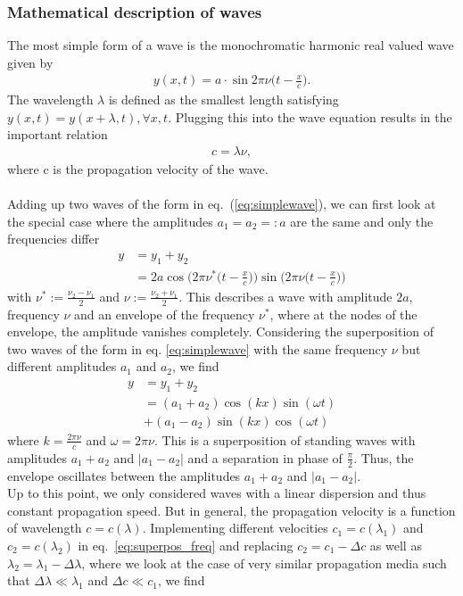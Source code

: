 \documentclass[a4paper,10pt,twocolumn]{article}
\begin{document}
    \subsubsection{Mathematical description of waves}
    The most simple form of a wave is the monochromatic harmonic real valued wave given by
    \begin{align}\label{eq:simplewave}
    y(x,t)=a\cdot\sin{2\pi\nu\Big(t-\frac{x}{c}\Big)}.
    \end{align}
    The wavelength $\lambda$ is defined as the smallest length satisfying $y(x,t)={y(x+\lambda,t), \forall x,t}$. Plugging this into the wave equation results in the important relation
    \begin{align*}
        c=\lambda\nu,
    \end{align*}
    where c is the propagation velocity of the wave.
    \\\\Adding up two waves of the form in eq.~(\ref{eq:simplewave}), we can first look at the special case where the amplitudes $a_1=a_2=:a$ are the same and only the frequencies differ
    \begin{align}
        y&=y_1+y_2 \nonumber\\&=2a\cos{\Big(2\pi\nu^*\big(t-\frac{x}{c}\big)\Big)}\sin{\Big(2\pi\nu\big(t-\frac{x}{c}\big)\Big)}
        \label{eq:superpos_freq}
    \end{align}
    with $\nu^*:=\frac{\nu_2-\nu_1}{2}$ and $\nu:=\frac{\nu_2+\nu_1}{2}$. This describes a wave with amplitude $2a$, frequency $\nu$ and an envelope of the frequency $\nu^*$, where at the nodes of the envelope, the amplitude vanishes completely.
    Considering the superposition of two waves of the form in eq. \ref{eq:simplewave} with the same frequency $\nu$ but different amplitudes $a_1$ and $a_2$, we find
    \begin{align}
        y&=y_1+y_2\nonumber\\&=(a_1+a_2)\cos{(kx)}\sin{(\omega t)}\nonumber\\&+ (a_1-a_2)\sin{(kx)}\cos{(\omega t)}
        \label{eq:superpos_amp}
    \end{align}
    where $k=\frac{2\pi\nu}{c}$ and $\omega=2\pi\nu$. This is a superposition of standing waves with amplitudes $a_1+a_2$ and $|a_1-a_2|$ and a separation in phase of $\frac{\pi}{2}$. Thus, the envelope oscillates between the amplitudes $a_1+a_2$ and $|a_1-a_2|$.\\
    Up to this point, we only considered waves with a linear dispersion and thus constant propagation speed. But in general, the propagation velocity is a function of wavelength $c=c(\lambda)$. Implementing different velocities $c_1=c(\lambda_1)$ and $c_2=c(\lambda_2)$ in eq.~\ref{eq:superpos_freq} and replacing $c_2=c_1-\Delta c$ as well as $\lambda_2=\lambda_1-\Delta\lambda$, where we look at the case of very similar propagation media such that $\Delta\lambda \ll \lambda_1$ and $\Delta c \ll c_1$, we find
\end{document}
